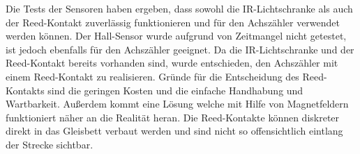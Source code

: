 Die Tests der Sensoren haben ergeben, dass sowohl die IR-Lichtschranke als auch der Reed-Kontakt zuverlässig funktionieren und für den Achszähler verwendet werden können. Der Hall-Sensor wurde aufgrund von Zeitmangel nicht getestet, ist jedoch ebenfalls für den Achszähler geeignet. Da die IR-Lichtschranke und der Reed-Kontakt bereits vorhanden sind, wurde entschieden, den Achszähler mit einem Reed-Kontakt zu realisieren. 
\newline
Gründe für die Entscheidung des Reed-Kontakts sind die geringen Kosten und die einfache Handhabung und Wartbarkeit. Außerdem kommt eine Lösung welche mit Hilfe von Magnetfeldern funktioniert näher an die Realität heran. Die Reed-Kontakte können diskreter direkt in das Gleisbett verbaut werden und sind nicht so offensichtlich eintlang der Strecke sichtbar. 
